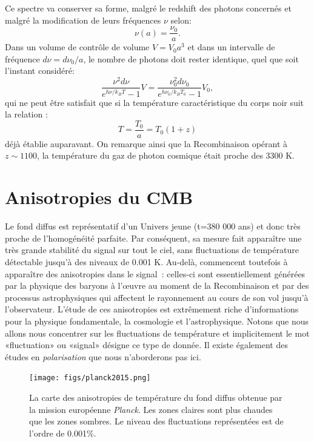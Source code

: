 Ce spectre va conserver sa forme, malgré le redshift des photons concernés et malgré la modification de leurs fréquences $\nu$ selon:
\begin{equation}
\nu(a)=\frac{\nu_0}{a}.
\end{equation}
Dans un volume de contrôle de volume $V=V_0a^3$ et dans un intervalle de fréquence $d\nu=d\nu_0/a$, le nombre de photons doit rester identique, quel que soit l'instant considéré:
\begin{equation}
\frac{\nu^2d\nu}{e^{h\nu/k_BT}-1}V=\frac{\nu_0^2d\nu_0}{e^{h\nu_0/k_BT_0}-1}V_0,
\end{equation}
qui ne peut être satisfait que si la température caractéristique du corps noir suit la relation :
\begin{equation}
T=\frac{T_0}{a}=T_0(1+z)
\end{equation}
déjà établie auparavant. On remarque ainsi que la Recombinaison opérant à $z\sim1100$, la température du gaz de photon cosmique était proche des 3300 K.

\section{Anisotropies du CMB}
Le fond diffus est représentatif d'un Univers jeune (t=380 000 ans) et donc très proche de l'homogénéité parfaite. Par conséquent, sa mesure fait apparaître une très grande stabilité du signal sur tout le ciel, sans fluctuations de température détectable jusqu'à des niveaux de 0.001 K. Au-delà, commencent toutefois à apparaître des anisotropies dans le signal~: celles-ci sont essentiellement générées par la physique des baryons à l'œuvre au moment de la Recombinaison et par des processus astrophysiques qui affectent le rayonnement au cours de son vol jusqu'à l'observateur. L'étude de ces anisotropies est extrêmement riche d'informations pour la physique fondamentale, la cosmologie et l'astrophysique. Notons que nous allons nous concentrer sur les fluctuations de température et implicitement le mot «fluctuation» ou «signal» désigne ce type de donnée. Il existe également des études en \textit{polarisation} que nous n'aborderons pas ici.

\begin{figure}[htbp]
	\centering
		\texttt{[image: figs/planck2015.png]}
		\caption[Les fluctuations de température vues par Planck]{La carte des anisotropies de température du fond diffus obtenue par la mission européenne \textit{Planck}. Les zones claires sont plus chaudes que les zones sombres. Le niveau des fluctuations représentées est de l'ordre de 0.001\%.}
	\label{f:planckmap}
\end{figure}

